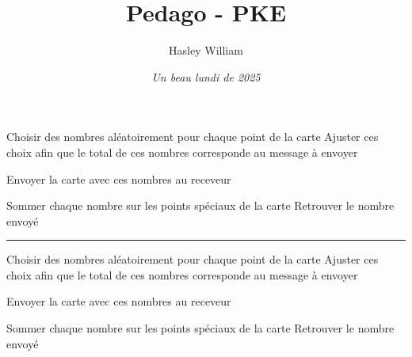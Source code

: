\documentclass{article}
\title{\textbf{Pedago - PKE}}
\date{\textit{Un beau lundi de 2025}}
\author{Hasley William}
\begin{document}
\begin{algorithm}[H]
\SetAlgoLined
\SetNoFillComment
\vspace{3mm}

Choisir des nombres aléatoirement pour chaque point de la carte\;
Ajuster ces choix afin que le total de ces nombres corresponde au message à envoyer\;


Envoyer la carte avec ces nombres au receveur\;

\caption{Procédure d'Encodage}
\end{algorithm}

\vspace{5em}

\begin{algorithm}[H]
\SetAlgoLined
\SetNoFillComment
\vspace{3mm}

Sommer chaque nombre sur les points spéciaux de la carte\;
Retrouver le nombre envoyé\;

\caption{Procédure de Décodage}
\end{algorithm}

\vspace{3em}

\noindent\rule{\textwidth}{1pt}

\vspace{3em}

\begin{algorithm}[H]
\SetAlgoLined
\SetNoFillComment
\vspace{3mm}

Choisir des nombres aléatoirement pour chaque point de la carte\;
Ajuster ces choix afin que le total de ces nombres corresponde au message à envoyer\;


Envoyer la carte avec ces nombres au receveur\;

\caption{Procédure d'Encodage}
\end{algorithm}

\vspace{5em}

\begin{algorithm}[H]
\SetAlgoLined
\SetNoFillComment
\vspace{3mm}

Sommer chaque nombre sur les points spéciaux de la carte\;
Retrouver le nombre envoyé\;

\caption{Procédure de Décodage}
\end{algorithm}
\end{document}
